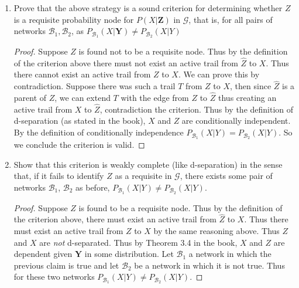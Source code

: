 \documentclass[12pt]{article}
\begin{document}
\begin{enumerate}[1.]
	\item Prove that the above strategy is a sound criterion for determining whether $Z$ is a requisite probability node for $P(X|\mathbf{Z})$ in $\mathcal{G}$, that is, for all pairs of networks $\mathcal{B}_1,\mathcal{B}_2$, as $P_{\mathcal{B}_1}(X|\mathbf{Y}) \not = P_{\mathcal{B}_2}(X|Y)$ 
	\begin{proof}
	Suppose $Z$ is found not to be a requisite node. Thus by the definition of the criterion above there must not exist an active trail from $\hat{Z}$ to $X$. Thus there cannot exist an active trail from $Z$ to $X$. We can prove this by  contradiction. Suppose there was such a trail $T$ from $Z$ to $X$, then since $\hat{Z}$ is a parent of $Z$, we can extend $T$ with the edge from $Z$ to $\hat{Z}$ thus creating an active trail from $X$ to $\hat{Z}$, contradiction the criterion. Thus by the definition of d-separation (as stated in the book), $X$ and $Z$ are conditionally independent. By the definition of conditionally independence $P_{\mathcal{B}_1}(X|Y) = P_{\mathcal{B}_2}(X|Y)$. So we conclude the criterion is valid.
	\end{proof}
	\item 
	Show that this criterion is weakly complete (like d-separation) in the sense that,
if it fails to identify $Z$ as a requisite in $\mathcal{G}$, there exists some pair of networks $\mathcal{B}_1$, $\mathcal{B}_2$ as before, $P_{\mathcal{B}_1}(X|Y) \not = P_{\mathcal{B}_2}(X|Y)$.
\begin{proof}
	Suppose $Z$ is found to be a requisite node. Thus by the definition of the criterion above, there must exist an active trail from $\hat{Z}$ to $X$. Thus there must exist an active trail from $Z$ to $X$ by the same reasoning above. Thus $Z$ and $X$ are \textit{not} d-separated. Thus by Theorem 3.4 in the book, $X$ and $Z$ are dependent given $\mathbf{Y}$ in some distribution. Let $\mathcal{B}_1$ a network in which the previous claim is true and let $\mathcal{B}_2$ be a network in which it is not true. Thus for these two networks $P_{\mathcal{B}_1}(X|Y) \not = P_{\mathcal{B}_2}(X|Y)$.
	\end{proof}
\end{enumerate}
\end{document}

